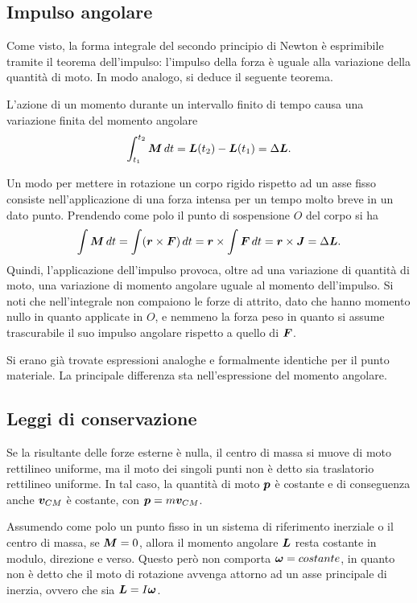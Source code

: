 \subsection{Impulso angolare}
Come visto, la forma integrale del secondo principio di Newton è esprimibile tramite il teorema dell'impulso: l'impulso della forza è uguale alla variazione della quantità di moto. In modo analogo, si deduce il seguente teorema.
\begin{teo}
    L'azione di un momento durante un intervallo finito di tempo causa una variazione finita del momento angolare
    \begin{equation}
        \int_{t_1}^{t_2}\bm{M}\,dt=\bm{L}(t_2)-\bm{L}(t_1)=\Delta\bm{L}.
    \end{equation}
\end{teo}
Un modo per mettere in rotazione un corpo rigido rispetto ad un asse fisso consiste nell'applicazione di una forza intensa per un tempo molto breve in un dato punto. Prendendo come polo il punto di sospensione $O$ del corpo si ha
\begin{equation}
    \int\bm{M}\,dt=\int(\bm{r}\times\bm{F})\,dt=\bm{r}\times\int\bm{F}\,dt=\bm{r}\times\bm{J}=\Delta\bm{L}.
\end{equation}
Quindi, l'applicazione dell'impulso provoca, oltre ad una variazione di quantità di moto, una variazione di momento angolare uguale al momento dell'impulso. Si noti che nell'integrale non compaiono le forze di attrito, dato che hanno momento nullo in quanto applicate in $O$, e nemmeno la forza peso in quanto si assume trascurabile il suo impulso angolare rispetto a quello di $\bm{F}$.
\begin{obs}
    Si erano già trovate espressioni analoghe e formalmente identiche per il punto materiale. La principale differenza sta nell'espressione del momento angolare.
\end{obs}

\subsection{Leggi di conservazione}
Se la risultante delle forze esterne è nulla, il centro di massa si muove di moto rettilineo uniforme, ma il moto dei singoli punti non è detto sia traslatorio rettilineo uniforme. In tal caso, la quantità di moto $\bm{p}$ è costante e di conseguenza anche $\bm{v}_{CM}$ è costante, con $\bm{p}=m\bm{v}_{CM}$. 

Assumendo come polo un punto fisso in un sistema di riferimento inerziale o il centro di massa, se $\bm{M}=0$, allora il momento angolare $\bm{L}$ resta costante in modulo, direzione e verso. Questo però non comporta $\bm{\omega}=costante$, in quanto non è detto che il moto di rotazione avvenga attorno ad un asse principale di inerzia, ovvero che sia $\bm{L}=I\bm{\omega}$.


